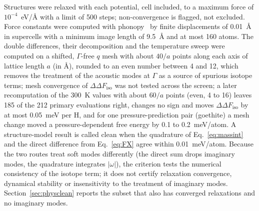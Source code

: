 \documentclass[aps,prmaterials,reprint,superscriptaddress,nofootinbib]{revtex4-2}
\newcommand{\ddF}{\Delta\Delta F_{\mathrm{iso}}}
\begin{document}
Structures were relaxed with each potential, cell included, to a maximum force of $10^{-4}$~eV/\AA{} with a limit of 500 steps; non-convergence is flagged, not excluded. Force constants were computed with phonopy~\cite{Togo2015,Togo2023} by finite displacements of 0.01~\AA{} in supercells with a minimum image length of 9.5~\AA{} and at most 160 atoms. The double differences, their decomposition and the temperature sweep were computed on a shifted, $\Gamma$-free $q$ mesh with about $40/a$ points along each axis of lattice length $a$ (in \AA), rounded to an even number between 4 and 12, which removes the treatment of the acoustic modes at $\Gamma$ as a source of spurious isotope terms; mesh convergence of $\ddF$ was not tested across the screen; a later recomputation of the 300~K values with about $60/a$ points (even, 4 to 16) leaves 185 of the 212 primary evaluations right, changes no sign and moves $\ddF$ by at most 0.05~meV per H, and for one pressure-prediction pair (goethite) a mesh change moved a pressure-dependent free energy by 0.1 to 0.2~meV/atom. A structure-model result is called clean when the quadrature of Eq.~\eqref{eq:massint} and the direct difference from Eq.~\eqref{eq:FX} agree within 0.01~meV/atom. Because the two routes treat soft modes differently (the direct sum drops imaginary modes, the quadrature integrates $|\omega|$), the criterion tests the numerical consistency of the isotope term; it does not certify relaxation convergence, dynamical stability or insensitivity to the treatment of imaginary modes. Section~\ref{sec:physclean} reports the subset that also has converged relaxations and no imaginary modes.
\end{document}
